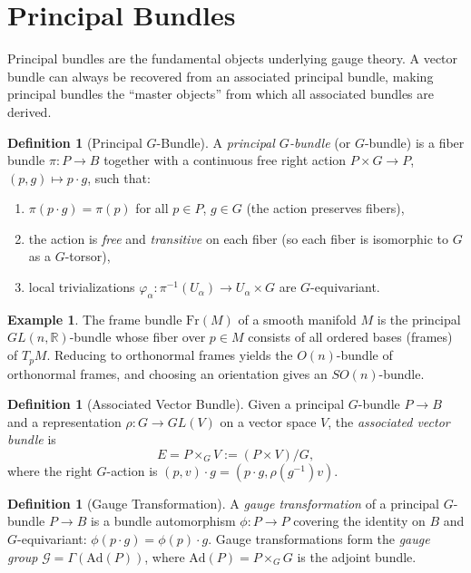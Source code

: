 \documentclass[12pt,a4paper]{amsart}
\theoremstyle{definition}
\newtheorem{definition}[theorem]{Definition}
\newtheorem{example}[theorem]{Example}
\begin{document}
\section{Principal Bundles}
\label{sec:principal}

Principal bundles are the fundamental objects underlying gauge theory. A vector
bundle can always be recovered from an associated principal bundle, making
principal bundles the ``master objects'' from which all associated bundles are
derived.

\begin{definition}[Principal $G$-Bundle]
A \emph{principal $G$-bundle} (or $G$-bundle) is a fiber bundle
$\pi \colon P \to B$ together with a continuous free right action
$P \times G \to P$, $(p, g) \mapsto p \cdot g$, such that:
\begin{enumerate}[noitemsep]
  \item $\pi(p \cdot g) = \pi(p)$ for all $p \in P$, $g \in G$ (the action
        preserves fibers),
  \item the action is \emph{free} and \emph{transitive} on each fiber
        (so each fiber is isomorphic to $G$ as a $G$-torsor),
  \item local trivializations $\varphi_\alpha \colon \pi^{-1}(U_\alpha) \to
        U_\alpha \times G$ are $G$-equivariant.
\end{enumerate}
\end{definition}

\begin{example}
The frame bundle $\mathrm{Fr}(M)$ of a smooth manifold $M$ is the principal
$GL(n,\mathbb{R})$-bundle whose fiber over $p \in M$ consists of all ordered
bases (frames) of $T_pM$. Reducing to orthonormal frames yields the
$O(n)$-bundle of orthonormal frames, and choosing an orientation gives an
$SO(n)$-bundle.
\end{example}

\begin{definition}[Associated Vector Bundle]
Given a principal $G$-bundle $P \to B$ and a representation $\rho \colon G \to
GL(V)$ on a vector space $V$, the \emph{associated vector bundle} is
\[
  E = P \times_G V := (P \times V) / G,
\]
where the right $G$-action is $(p, v) \cdot g = (p \cdot g, \rho(g^{-1}) v)$.
\end{definition}

\begin{definition}[Gauge Transformation]
A \emph{gauge transformation} of a principal $G$-bundle $P \to B$ is a bundle
automorphism $\phi \colon P \to P$ covering the identity on $B$ and
$G$-equivariant: $\phi(p \cdot g) = \phi(p) \cdot g$. Gauge transformations
form the \emph{gauge group} $\mathcal{G} = \Gamma(\mathrm{Ad}(P))$, where
$\mathrm{Ad}(P) = P \times_G G$ is the adjoint bundle.
\end{definition}
\end{document}

